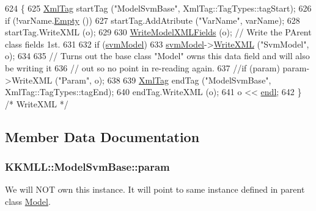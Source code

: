 \begin{DoxyCode}
624 \{
625   \hyperlink{class_k_k_b_1_1_xml_tag}{XmlTag}  startTag (\textcolor{stringliteral}{"ModelSvmBase"},  XmlTag::TagTypes::tagStart);
626   \textcolor{keywordflow}{if}  (!varName.\hyperlink{class_k_k_b_1_1_k_k_str_ac69942f73fffd672ec2a6e1c410afdb6}{Empty} ())
627     startTag.AddAtribute (\textcolor{stringliteral}{"VarName"}, varName);
628   startTag.WriteXML (o);
629 
630   \hyperlink{class_k_k_m_l_l_1_1_model_a560829876c8ca002f00592e428a780a2}{WriteModelXMLFields} (o);  \textcolor{comment}{// Write the PArent class fields 1st.}
631 
632   \textcolor{keywordflow}{if}  (\hyperlink{class_k_k_m_l_l_1_1_model_svm_base_a8f6ed793dfaa080ddea8e1776d2ee755}{svmModel})
633     \hyperlink{class_k_k_m_l_l_1_1_model_svm_base_a8f6ed793dfaa080ddea8e1776d2ee755}{svmModel}->\hyperlink{struct_s_v_m289___m_f_s_1_1_svm___model_ac0547f02f0aa730420892f4a7897d636}{WriteXML} (\textcolor{stringliteral}{"SvmModel"}, o);
634 
635   \textcolor{comment}{//  Turns out the base class "Model" owns this data field and will also be writing it}
636   \textcolor{comment}{// out so no point in re-reading again.}
637   \textcolor{comment}{//if  (param)  param->WriteXML ("Param", o);}
638 
639   \hyperlink{class_k_k_b_1_1_xml_tag}{XmlTag}  endTag (\textcolor{stringliteral}{"ModelSvmBase"}, XmlTag::TagTypes::tagEnd);
640   endTag.WriteXML (o);
641   o << \hyperlink{namespace_k_k_b_ad1f50f65af6adc8fa9e6f62d007818a8}{endl};
642 \}  \textcolor{comment}{/* WriteXML */}
\end{DoxyCode}


\subsection{Member Data Documentation}
\subsubsection[{\texorpdfstring{param}{param}}]{ K\+K\+M\+L\+L\+::\+Model\+Svm\+Base\+::param\hspace{0.3cm}{\ttfamily [protected]}}\hypertarget{class_k_k_m_l_l_1_1_model_svm_base_ab51783a9e9c03832590cb43294b3899f}{}\label{class_k_k_m_l_l_1_1_model_svm_base_ab51783a9e9c03832590cb43294b3899f}
We will N\+OT own this instance. It will point to same instance defined in parent class \hyperlink{class_k_k_m_l_l_1_1_model}{Model}. 

